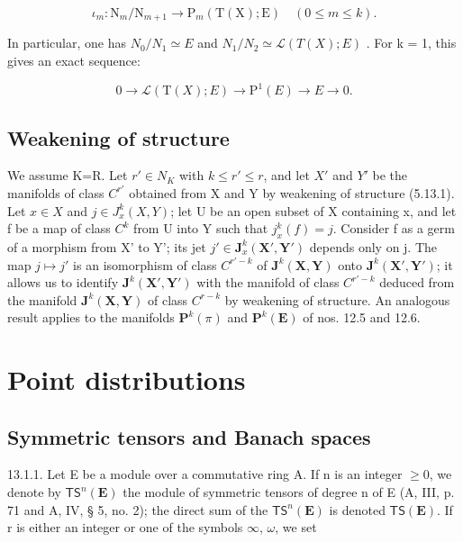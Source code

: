 \[
\iota_ {m} \colon \mathrm{N} _ {m} / \mathrm{N} _ {m + 1} \rightarrow \mathrm{P} _ {m} (\mathrm{T} (\mathrm{X}); \mathrm{E}) \quad (0 \leqslant m \leqslant k).
\]

In particular, one has \(N_{0}/N_{1} \simeq E\) and \(N_{1}/N_{2} \simeq \mathcal{L}(T(X); E)\) . For k = 1, this gives an exact sequence:

\[
0 \rightarrow \mathscr {L} (\mathrm{T} (X); E) \rightarrow \mathrm{P} ^ {1} (E) \rightarrow E \rightarrow 0.
\]

\subsection{Weakening of structure}

We assume K=R. Let \(r' \in N_{K}\) with \(k \leqslant r' \leqslant r\), and let \(X'\) and \(Y'\) be the manifolds of class \(C^{r'}\) obtained from X and Y by weakening of structure (5.13.1). Let \(x \in X\) and \(j \in J_{x}^{k}(X, Y)\); let U be an open subset of X containing x, and let f be a map of class \(C^{k}\) from U into Y such that \(j_{x}^{k}(f) = j\). Consider f as a germ of a morphism from X' to Y'; its jet \(j' \in \mathbf{J}_{x}^{k}(\mathbf{X}', \mathbf{Y}')\) depends only on j. The map \(j \mapsto j'\) is an isomorphism of class \(C^{r'-k}\) of \(\mathbf{J}^{k}(\mathbf{X}, \mathbf{Y})\) onto \(\mathbf{J}^{k}(\mathbf{X}', \mathbf{Y}')\); it allows us to identify \(\mathbf{J}^{k}(\mathbf{X}', \mathbf{Y}')\) with the manifold of class \(C^{r'-k}\) deduced from the manifold \(\mathbf{J}^{k}(\mathbf{X}, \mathbf{Y})\) of class \(C^{r-k}\) by weakening of structure. An analogous result applies to the manifolds \(\mathbf{P}^{k}(\pi)\) and \(\mathbf{P}^{k}(\mathbf{E})\) of nos. 12.5 and 12.6.

\section{Point distributions}

\subsection{Symmetric tensors and Banach spaces}

13.1.1. Let E be a module over a commutative ring A. If n is an integer \(\geqslant0\), we denote by \(\mathsf{TS}^{n}(\mathbf{E})\) the module of symmetric tensors of degree n of E (A, III, p. 71 and A, IV, § 5, no. 2); the direct sum of the \(\mathsf{TS}^{n}(\mathbf{E})\) is denoted \(\mathsf{TS}(\mathbf{E})\). If r is either an integer or one of the symbols \(\infty\), \(\omega\), we set

